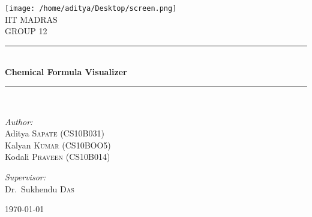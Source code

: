 \documentclass{report}
\newcommand{\HRule}{\rule{\linewidth}{0.5mm}}
\begin{document}
\begin{titlepage}
\begin{center}

\texttt{[image: /home/aditya/Desktop/screen.png]}~\\[1cm]

\textsc{\LARGE IIT MADRAS}\\[1.5cm]

\textsc{\Large GROUP 12}\\[0.5cm]

\HRule \\[0.4cm]
{ \huge \bfseries Chemical Formula Visualizer\\[0.4cm] }

\HRule \\[1.5cm]

\begin{minipage}{0.4\textwidth}
\begin{flushleft} \large
\emph{Author:}\\
Aditya \textsc{Sapate (CS10B031)}\\
Kalyan \textsc{Kumar (CS10BOO5)}\\
Kodali \textsc{Praveen (CS10B014)}\\
\end{flushleft}
\end{minipage}
\begin{minipage}{0.4\textwidth}
\begin{flushright} \large
\emph{Supervisor:} \\
Dr.~Sukhendu \textsc{Das}
\end{flushright}
\end{minipage}

\vfill

{\large \today}

\end{center}
\end{titlepage}
\end{document}
